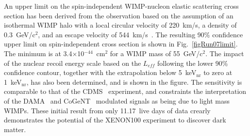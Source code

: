 An upper limit on the spin-independent WIMP-nucleon elastic scattering cross section has been derived from the observation based on the assumption of an isothermal WIMP halo with a local circular velocity of 220~km/s, a density of 0.3~GeV/c$^{2}$, and an escape velocity of 544~km/s~\cite{LewinSmith, Smith}. The resulting 90\% confidence upper limit on spin-independent cross section is shown in Fig.~\ref{figRun07limit}. The minimum is at 3.4$\times$10$^{-44}$~cm$^{2}$ for a WIMP mass of 55~GeV/c$^{2}$. The impact of the nuclear recoil energy scale based on the $L_{eff}$ following the lower 90\% confidence contour, together with the extrapolation below 5~keV$_{\mathrm{nr}}$ to zero at 1~keV$_{\mathrm{nr}}$, has also been determined, and is shown in the figure. 
The sensitivity is comparable to that of the CDMS~\cite{CDMS_limit} experiment, and constraints the interpretation of the DAMA~\cite{DAMA_LightWIMP} and CoGeNT~\cite{CoGeNT_LightWIMP, CoGeNT_modulation} modulated signals as being due to light mass WIMPs. These initial result from only 11.17~live days of data crearly demonstrates the potential of the XENON100 experiment to discover dark matter.














